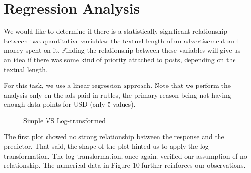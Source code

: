 \documentclass{article}
\begin{document}

\section*{\centering Regression Analysis}

We would like to determine if there is a statistically significant relationship
between two quantitative variables: the textual length of an advertisement and
money spent on it. Finding the relationship between these variables will give
us an idea if there was some kind of priority attached to posts, depending on
the textual length.

\bigskip

For this task, we use a linear regression approach. Note that we perform the
analysis only on the ads paid in rubles, the primary reason being not having
enough data points for USD (only 5 values).

\begin{figure}[H]
  \centering
  \hfill
  \caption{Simple VS Log-transformed}
\end{figure}

The first plot showed no strong relationship between the response and the
predictor. That said, the shape of the plot hinted us to apply the log
transformation. The log transformation, once again, verified our assumption
of no relationship. The numerical data in Figure 10 further reinforces our
observations.
\end{document}
